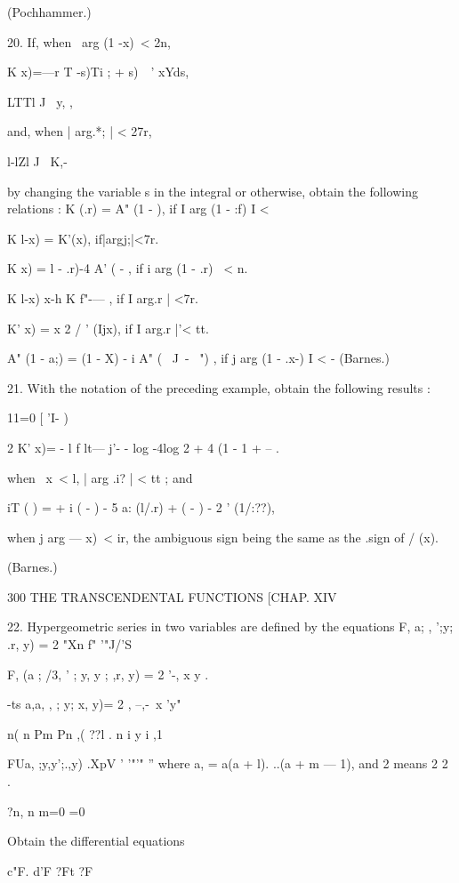 (Pochhammer.)

20. If, when \ arg (1 -x)\ < 2n,

K x)=—r T -s)Ti ; + s)\ \ ' xYds,

LTTl J \ y, ,

and, when | arg.*; | < 27r,

l-lZl J \ K,-

by changing the variable s in the integral or otherwise, obtain the
following relations : K (.r) = A" (1 - ), if I arg (1 - :f) I <

K l-x) = K'(x), if|argj;|<7r.

K x) = l - .r)-4 A' ( - , if i arg (1 - .r) \ < n.

K l-x) x-h K f"-— , if I arg.r | <7r.



K' x) = x 2 / ' (Ijx), if I arg.r |'< tt.

A" (1 - a;) = (1 - X) - i A" ( \ J\ - \ ") , if j arg (1 - .x-) I < -
(Barnes.)

21. With the notation of the preceding example, obtain the following
results :

11=0 [ 'I- )

2 K' x)= - l f lt— j'- - log -4log 2 + 4 (1 - 1 + -- .

when \ x\ < l, | arg .i? | < tt ; and

iT ( ) = + i ( - ) - 5 a: (l/.r) + ( - ) - 2 ' (1/:??),

when j arg — x)\ < ir, the ambiguous sign being the same as the .sign
of / (x).

(Barnes.)



300 THE TRANSCENDENTAL FUNCTIONS [CHAP. XIV

22. Hypergeometric series in two variables are defined by the
equations F, a; , ';y; .r, y) = 2 "Xn f" '"J/'S

F, (a ; /3, ' ; y, y ; ,r, y) = 2 '-, x y .



-ts a,a, , ; y; x, y)= 2 , --,-\ x 'y"



 n( n Pm Pn ,( ??l . n i y i ,1



FUa, ;y,y';.,y) .XpV ' '"'" '' where a, = a(a + l). ..(a + m — 1), and
2 means 2 2 .

?n, n m=0 =0

Obtain the differential equations

c"F. d'F ?Ft ?F

